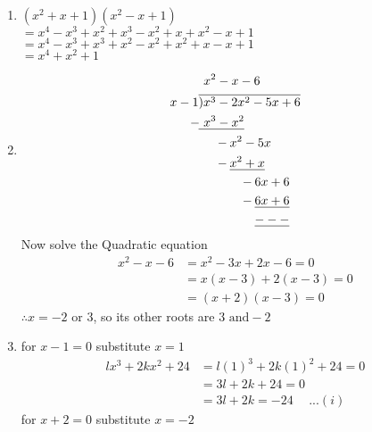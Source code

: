 \begin{multicols}{2}
\begin{enumerate}[label={\textbf{\arabic*.}}]
  \item $(x^2 + x + 1)(x^2 - x + 1)$ \\
    $ =  x^4 - x^3 + x ^2 + x^3 - x^2 + x + x^2 -x + 1$ \\
    $ =  x^4 - x^3 + x^3 + x ^2 - x^2 + x^2 + x  -x + 1$ \\
    $= x^4 + x^2 + 1$
  \item
    \begin{align*}
      & \hspace{ 4 pt} x ^2 - x -6 \\
    x -1 & \overline{) x^3 - 2x^2 - 5x + 6} \\
    -\hspace{-1pt} & \underline{ \hspace{4pt} x^ 3 - x^2} \\
    -\hspace{-23pt} & \hspace{25pt} x^2 - 5x  \\
    - \hspace{-23pt} &  \hspace{ 25pt} \underline{x^2 + x} \\
    - \hspace{-43pt} & \hspace{ 45pt} 6x + 6 \\
    - \hspace{-43pt} & \hspace{ 45pt} \underline{6x + 6}  \\
    & \hspace{ 45pt} \underline{---}
  \end{align*}
  Now solve the Quadratic equation
  \begin{align*}
    x^2 - x - 6 &= x^2 - 3x + 2x - 6 = 0 \\
    &  = x(x - 3) + 2(x - 3) = 0 \\
    & =  (x + 2)(x - 3) = 0
  \end{align*}
  $\therefore x = -2 \text{ or } 3$, so its other roots are $3 \text{ and} -2$
\item for $x-1 = 0$ substitute $x = 1$
  \begin{align*}
    lx^3 + 2kx^2 + 24 &= l(1)^3 + 2k(1)^2 + 24 = 0 \\
    & = 3l + 2k + 24 = 0 \\
    &= 3l + 2k = -24 \hspace{15pt}...(i)
  \end{align*}
  for $x+2 = 0$ substitute $x = -2$
  \begin{align*}

\end{align*}
\end{enumerate}
\end{multicols}
